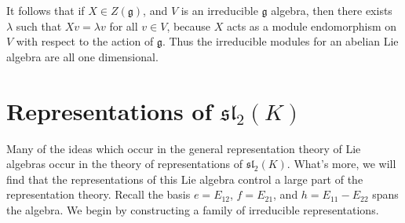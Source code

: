 It follows that if $X \in Z(\mathfrak{g})$, and $V$ is an irreducible $\mathfrak{g}$ algebra, then there exists $\lambda$ such that $Xv = \lambda v$ for all $v \in V$, because $X$ acts as a module endomorphism on $V$ with respect to the action of $\mathfrak{g}$. Thus the irreducible modules for an abelian Lie algebra are all one dimensional.

\section{Representations of $\mathfrak{sl}_2(K)$}

Many of the ideas which occur in the general representation theory of Lie algebras occur in the theory of representations of $\mathfrak{sl}_2(K)$. What's more, we will find that the representations of this Lie algebra control a large part of the representation theory. Recall the basis $e = E_{12}$, $f = E_{21}$, and $h = E_{11} - E_{22}$ spans the algebra. We begin by constructing a family of irreducible representations.

